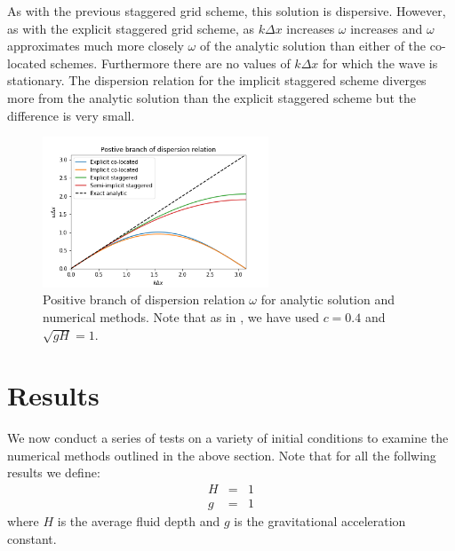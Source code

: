 \documentclass[a4paper, 10.5pt, notitlepage]{article}
\begin{document}
As with the previous staggered grid scheme, this solution is dispersive. However, as with the explicit staggered grid scheme, as $k\Delta x$ increases $\omega$ increases and $\omega$ approximates much more closely $\omega$ of the analytic solution than either of the co-located schemes. Furthermore there are no values of $k\Delta x$ for which the wave is stationary. The dispersion relation for the implicit staggered scheme diverges more from the analytic solution than the explicit staggered scheme but the difference is very small. 

\begin{figure}[H]
	\begin{center}

	\centering
	\includegraphics[width=0.6\textwidth]{dispersion_relations.png}
	\caption{Positive branch of dispersion relation $\omega$ for analytic solution and numerical methods. Note that as in \cite{MPE textbook}, we have used $c=0.4$ and $\sqrt{gH} = 1$.} \label{dispersionfigure}

	\end{center}
\end{figure}

\section{Results}\label{resultssection}
We now conduct a series of tests on a variety of initial conditions to examine the numerical methods outlined in the above section. Note that for all the follwing results we define:
\begin{eqnarray}
H & = & 1\\
g & = & 1
\end{eqnarray}
where $H$ is the average fluid depth and $g$ is the gravitational acceleration constant.
\end{document}

